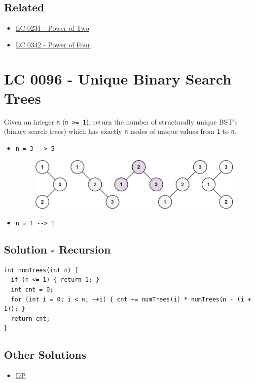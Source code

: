 \subsection*{Related}
\begin{itemize}
\item \hyperref[lc0231]{LC 0231 - Power of Two}
\item \hyperref[lc0342]{LC 0342 - Power of Four}
\end{itemize}

\section{LC 0096 - Unique Binary Search Trees}
Given an integer {\colorbox{CodeBackground}{\lstinline|n|}} ({\colorbox{CodeBackground}{\lstinline|n >= 1|}}), return the number of structurally unique BST's (binary search trees) which has exactly {\colorbox{CodeBackground}{\lstinline|n|}} nodes of unique values from {\colorbox{CodeBackground}{\lstinline|1|}} to {\colorbox{CodeBackground}{\lstinline|n|}}.

\begin{itemize}
\item {\colorbox{CodeBackground}{\lstinline|n = 3 --> 5|}}
\begin{figure}[H]
\centering
\includegraphics[width=0.65\linewidth]{images/lc0096_eg}
\end{figure}
\item {\colorbox{CodeBackground}{\lstinline|n = 1 --> 1|}}
\end{itemize}

\subsection*{Solution - Recursion}\label{solution:lc0096_recursion}
\begin{lstlisting}
int numTrees(int n) {
  if (n <= 1) { return 1; }
  int cnt = 0;
  for (int i = 0; i < n; ++i) { cnt += numTrees(i) * numTrees(n - (i + 1)); }
  return cnt;
}
\end{lstlisting}

\subsection*{Other Solutions}
\begin{itemize}
\item \hyperref[solution:lc0096_dp]{DP}
\end{itemize}